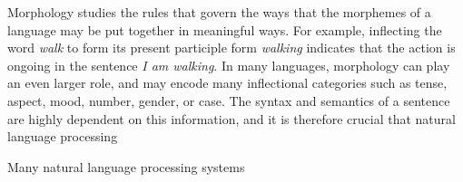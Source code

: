 Morphology studies the rules that govern the ways that the morphemes
of a language may be put together in meaningful ways. For example,
inflecting the word \textit{walk} to form its present participle form
\textit{walking} indicates that the action is ongoing in the sentence
\textit{I am walking}. In many languages, morphology can play an even
larger role, and may encode many inflectional categories such as
tense, aspect, mood, number, gender, or case. The syntax and semantics
of a sentence are highly dependent on this information, and it is
therefore crucial that natural language processing 

Many natural language processing systems 
